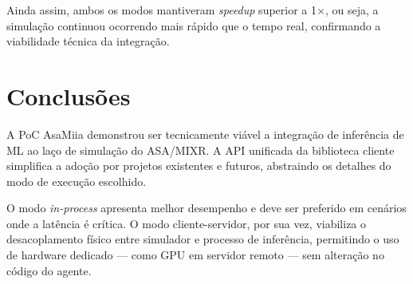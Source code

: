 Ainda assim, ambos os modos mantiveram \textit{speedup} superior a 1$\times$, ou seja, a simulação continuou ocorrendo mais rápido que o tempo real, confirmando a viabilidade técnica da integração.

\section{Conclusões}

A PoC AsaMiia demonstrou ser tecnicamente viável a integração de inferência de ML ao laço de simulação do ASA/MIXR. A API unificada da biblioteca cliente simplifica a adoção por projetos existentes e futuros, abstraindo os detalhes do modo de execução escolhido.

O modo \textit{in-process} apresenta melhor desempenho e deve ser preferido em cenários onde a latência é crítica. O modo cliente-servidor, por sua vez, viabiliza o desacoplamento físico entre simulador e processo de inferência, permitindo o uso de hardware dedicado --- como GPU em servidor remoto --- sem alteração no código do agente.